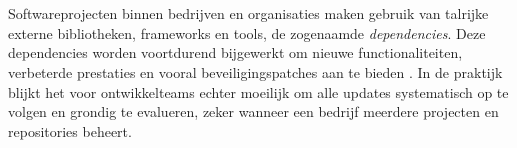 
\chapter{}%
\label{ch:inleiding}

Softwareprojecten binnen bedrijven en organisaties maken gebruik van talrijke externe bibliotheken, frameworks en tools, de zogenaamde \emph{dependencies}. Deze dependencies worden voortdurend bijgewerkt om nieuwe functionaliteiten, verbeterde prestaties en vooral beveiligingspatches aan te bieden \autocite {Pashchenko2018}. In de praktijk blijkt het voor ontwikkelteams echter moeilijk om alle updates systematisch op te volgen en grondig te evalueren, zeker wanneer een bedrijf meerdere projecten en repositories beheert.

\section{}%
\label{sec:probleemstelling}

